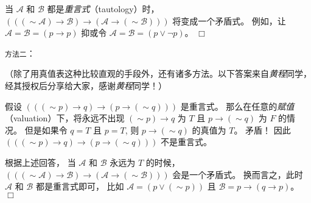 \documentclass[UTF8,12pt,a4paper]{ctexart}
\newcommand{\negs}{\sim\!}
\begin{document}
当  $\mathscr{A}$ 和 $\mathscr{B}$ 都是\textit{重言式}（tautology）时，
$(((\negs \mathscr{A}) \to \mathscr{B})  \to (\mathscr{A} \to (\negs \mathscr{B})))$ 
将变成一个矛盾式。
例如，让 $\mathscr{A} = \mathscr{B} = (p \to p)$ 抑或令
$\mathscr{A} = \mathscr{B} = (p \lor  \neg p)$。
\hfill $\Box$


\vspace{1em}
\noindent \texttt{方法二}：

（除了用真值表这种比较直观的手段外，还有诸多方法。以下答案来自\textit{黄程}同学，经其授权后分享给大家，感谢\textit{黄程}同学！）

假设 $(((\negs p) \to q)  \to (p \to (\negs q)))$ 是重言式。
那么在任意的\textit{赋值}（valuation）下，将永远不出现 $(\negs p) \to q $ 为 $T$ 且 $p \to (\negs q)$ 为 $F$ 的情况。 
但是如果令 $q = T$ 且 $p = T$, 
则 $p \to (\negs q)$ 的真值为 $T$。
矛盾！ 
因此 $(((\negs p) \to q)  \to (p \to (\negs q)))$ 不是重言式。


根据上述回答，
当  $\mathscr{A}$ 和 $\mathscr{B}$ 永远为 $T$ 的时候，
$(((\negs \mathscr{A}) \to \mathscr{B})  \to (\mathscr{A} \to (\negs \mathscr{B})))$ 会是一个矛盾式。
换而言之，此时
$\mathscr{A}$ 和  $\mathscr{B}$ 都是重言式即可，
比如 
$\mathscr{A} = (p \lor  (\negs p))$ 且 $\mathscr{B} = p \to (q \to p)$。
\hfill $\Box$
\end{document}

